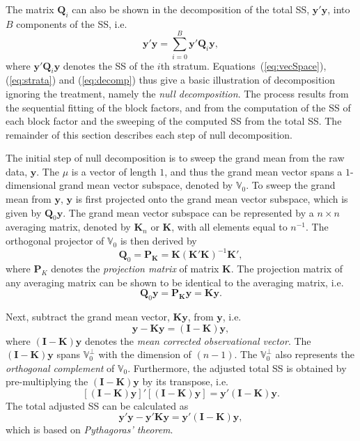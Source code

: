 \documentclass[article]{jss}
\newcommand{\mP}{\mathbf{P}}
\newcommand{\I}{\mathbf{I}}
\newcommand{\K}{\mathbf{K}}
\newcommand{\Q}{\mathbf{Q}}
\begin{document}
The matrix $\Q_i$ can also be shown in the decomposition of the total SS, $\bm{y}'\bm{y}$, into $B$ components of the SS, i.e.\ 
\begin{equation}
\label{eq:decomp}
\bm{y}'\bm{y} = \sum_{i=0}^{B}\bm{y}'\Q_i\bm{y},
\end{equation}
where $\bm{y}'\Q_i\bm{y}$ denotes the SS of the $i$th stratum.  Equations~(\ref{eq:vecSpace}), (\ref{eq:strata}) and (\ref{eq:decomp}) thus give a basic illustration of decomposition ignoring the treatment, namely the \emph{null decomposition}. The process results from the sequential fitting of the block factors, and from the computation of the SS of each block factor and the sweeping of the computed SS from the total SS. The remainder of this section describes each step of null decomposition.

The initial step of null decomposition is to sweep the grand mean from the raw data, $\bm{y}$. The $\mu$ is a vector of length $1$, and thus the grand mean vector spans a $1$-dimensional grand mean vector subspace, denoted by $\mathbb{V}_0$. To sweep the grand mean from $\bm{y}$, $\bm{y}$ is first projected onto the grand mean vector subspace, which is given by $\Q_{0}\bm{y}$. The grand mean vector subspace can be represented by a $n \times n$ averaging matrix, denoted by $\K_n$ or $\K$, with all elements equal to ${n}^{-1}$. The orthogonal projector of $\mathbb{V}_0$ is then derived by
\begin{equation}
\label{eq:vectorProj}
\Q_{0} = \mP_{\K} = {\K}({\K}'{\K})^{-1}{\K}',
\end{equation}
where $\mP_K$ denotes the \emph{projection matrix} of matrix $\K$. The projection matrix of any averaging matrix can be shown to be identical to the averaging matrix, i.e.\ 
\[\Q_{0} \bm{y} = \mP_{\K} \bm{y} = {\K} \bm{y}.\] 

Next, subtract the grand mean vector, $\K\bm{y}$, from $\bm{y}$, i.e.\
\[\bm{y} -  \K\bm{y} = (\I-\K)\bm{y},\]
where $(\I-\K)\bm{y}$ denotes the \emph{mean corrected observational vector}. The $(\I-\K)\bm{y}$ spans $\mathbb{V}^{\perp}_0$ with the dimension of $(n - 1)$. The $\mathbb{V}^{\perp}_0$ also represents the \emph{orthogonal complement} of $\mathbb{V}_0$. Furthermore, the adjusted total SS is obtained by pre-multiplying the $(\I-\K)\bm{y}$ by its transpose, i.e.\
\begin{equation}
\label{eq:adjustSS}
[(\I-\K)\bm{y}]'[(\I-\K)\bm{y}] = \bm{y}'(\I-\K)\bm{y}.
\end{equation}
The total adjusted SS can be calculated as
\[
\bm{y}'\bm{y} - \bm{y}'\K\bm{y} = \bm{y}'(\I-\K)\bm{y},
\]
which is based on \emph{Pythagoras' theorem}.
\end{document}
